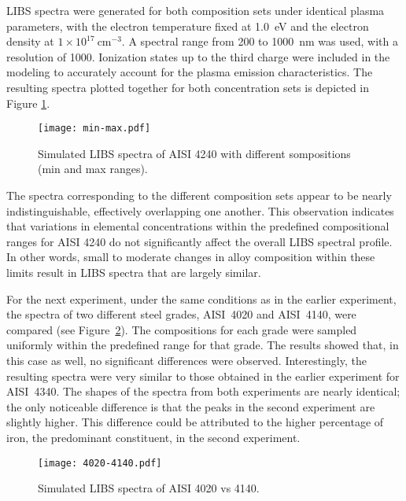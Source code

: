 \documentclass[12pt,a4paper]{article}
\begin{document}
	
	LIBS spectra were generated for both composition sets under identical plasma parameters, with the electron temperature fixed at 1.0~eV and the electron density at $1 \times 10^{17}~\text{cm}^{-3}$. A spectral range from 200 to 1000~nm was used, with a resolution of 1000. Ionization states up to the third charge were included in the modeling to accurately account for the plasma emission characteristics. The resulting spectra plotted together for both concentration sets is depicted in Figure \ref{fig:min-max}.
	
	
	
	\begin{figure}[h!]
		\centering
		\texttt{[image: min-max.pdf]}
		\caption{Simulated LIBS spectra of AISI 4240 with different sompositions (min and max ranges).}
		\label{fig:min-max}
	\end{figure} 
	The spectra corresponding to the different composition sets appear to be nearly indistinguishable, effectively overlapping one another. This observation indicates that variations in elemental concentrations within the predefined compositional ranges for AISI 4240 do not significantly affect the overall LIBS spectral profile. In other words, small to moderate changes in alloy composition within these limits result in LIBS spectra that are largely similar.
	
	For the next experiment, under the same conditions as in the earlier experiment, the spectra of two different steel grades, AISI~4020 and AISI~4140, were compared (see Figure~\ref{fig:4020-4140}). The compositions for each grade were sampled uniformly within the predefined range for that grade. The results showed that, in this case as well, no significant differences were observed. Interestingly, the resulting spectra were very similar to those obtained in the earlier experiment for AISI~4340. The shapes of the spectra from both experiments are nearly identical; the only noticeable difference is that the peaks in the second experiment are slightly higher. This difference could be attributed to the higher percentage of iron, the predominant constituent, in the second experiment.
	
	
	\begin{figure}[h!]
		\centering
		\texttt{[image: 4020-4140.pdf]}
		\caption{Simulated LIBS spectra of AISI 4020 vs 4140.}
		\label{fig:4020-4140}
	\end{figure} 
\end{document}
